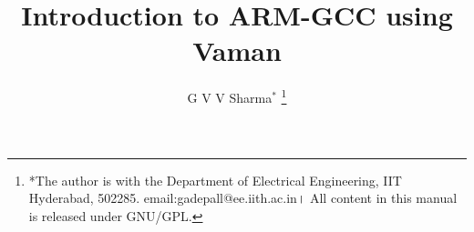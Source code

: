 \documentclass[journal,12pt,twocolumn]{IEEEtran}
\renewcommand\thesection{\arabic{section}}
\begin{document}
\let\StandardTheFigure\thefigure
\let\vec\mathbf
\renewcommand{\thefigure}{\thesection}



\def\putbox#1#2#3{\makebox[0in][l]{\makebox[#1][l]{}\raisebox{\baselineskip}[0in][0in]{\raisebox{#2}[0in][0in]{#3}}}}
     \def\rightbox#1{\makebox[0in][r]{#1}}
     \def\centbox#1{\makebox[0in]{#1}}
     \def\topbox#1{\raisebox{-\baselineskip}[0in][0in]{#1}}
     \def\midbox#1{\raisebox{-0.5\baselineskip}[0in][0in]{#1}}

\vspace{3cm}

\title{
Introduction to ARM-GCC using Vaman
}
\author{ 
G V V Sharma$^{*}$%
	\thanks{*The author is with the Department of Electrical Engineering, IIT Hyderabad, 502285. email:gadepall@ee.iith.ac.in। All content in this manual is released under GNU/GPL.}
	
}	


%
%
%
\end{document}

